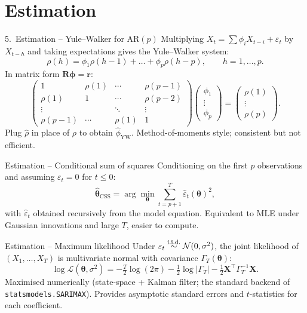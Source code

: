 \documentclass[aspectratio=169]{beamer}
\begin{document}
\section{Estimation}

\begin{frame}{5.~Estimation -- Yule--Walker for AR$(p)$}
  Multiplying $X_t = \sum \phi_i X_{t-i} + \varepsilon_t$ by
  $X_{t-h}$ and taking expectations gives the Yule--Walker system:
  \[
    \rho(h) = \phi_1 \rho(h-1) + \dots + \phi_p \rho(h-p),
    \qquad h = 1, \dots, p.
  \]
  In matrix form $\bm R \bm\phi = \bm r$:
  \[
    \begin{pmatrix}
      1 & \rho(1) & \cdots & \rho(p-1) \\
      \rho(1) & 1 & \cdots & \rho(p-2) \\
      \vdots & & \ddots & \vdots \\
      \rho(p-1) & \cdots & \rho(1) & 1
    \end{pmatrix}
    \begin{pmatrix}\phi_1 \\ \vdots \\ \phi_p\end{pmatrix}
    =
    \begin{pmatrix}\rho(1) \\ \vdots \\ \rho(p)\end{pmatrix}.
  \]
  Plug $\widehat\rho$ in place of $\rho$ to obtain
  $\widehat\phi_{\text{YW}}$. Method-of-moments style; consistent but
  not efficient.
\end{frame}

\begin{frame}{Estimation -- Conditional sum of squares}
  Conditioning on the first $p$ observations and assuming
  $\varepsilon_t = 0$ for $t \leq 0$:
  \[
    \widehat{\bm\theta}_{\text{CSS}}
    = \arg\min_{\bm\theta}
      \sum_{t = p+1}^{T} \widehat\varepsilon_t(\bm\theta)^2,
  \]
  with $\widehat\varepsilon_t$ obtained recursively from the model
  equation. Equivalent to MLE under Gaussian innovations and large
  $T$, easier to compute.
\end{frame}

\begin{frame}{Estimation -- Maximum likelihood}
  Under $\varepsilon_t \overset{\text{i.i.d.}}{\sim} \mathcal N(0, \sigma^2)$, the joint
  likelihood of $(X_1, \dots, X_T)$ is multivariate normal with
  covariance $\Gamma_T(\bm\theta)$:
  \[
    \log \mathcal L(\bm\theta, \sigma^2)
    = -\tfrac{T}{2}\log(2\pi)
      -\tfrac{1}{2}\log|\Gamma_T|
      -\tfrac{1}{2} \bm X^\top \Gamma_T^{-1} \bm X.
  \]
  \pause
  Maximised numerically (state-space + Kalman filter; the standard
  backend of \texttt{statsmodels.SARIMAX}). Provides asymptotic
  standard errors and $t$-statistics for each coefficient.
\end{frame}
\end{document}
